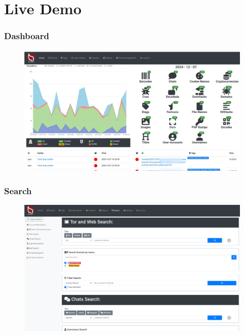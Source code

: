 \documentclass[10pt,aspectratio=169, colorlinks=true, linkcolor=circlBlue]{beamer}
\begin{document}
\section{Live Demo}

\begin{frame}
    \frametitle{Dashboard}
    \begin{figure}
        \includegraphics[scale=0.16, angle=0]{screenshot/dashboard.jpeg}
    \end{figure}
\end{frame}

\begin{frame}
    \frametitle{Search}
    \begin{figure}
        \includegraphics[scale=0.18, angle=0]{screenshot/search.png}
    \end{figure}
\end{frame}
\end{document}
